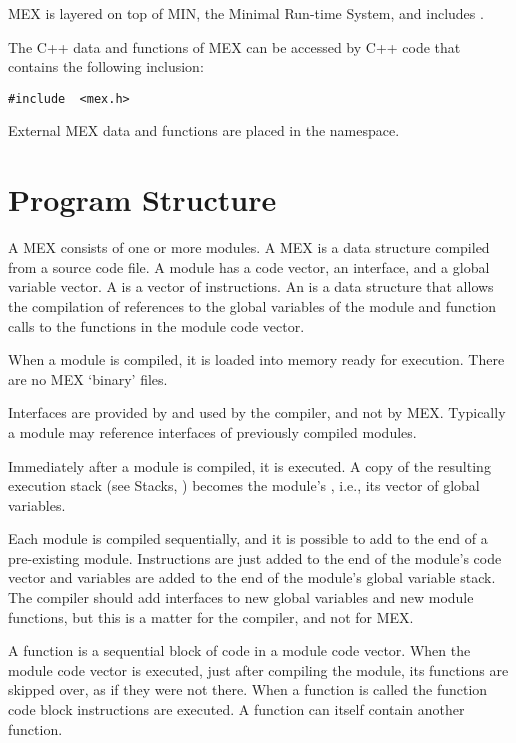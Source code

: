 \documentclass[12pt]{article}
\begin{document}
MEX is layered on top of MIN, the Minimal Run-time System, and
includes .

The C++ data and functions of MEX can be
accessed by C++ code that contains the following inclusion:

\begin{center}
\verb|#include  <mex.h>|
\end{center}

External MEX data and functions are placed in the
 namespace.

\section{Program Structure}
\label{PROGRAM-STRUCTURE}

A MEX  consists of one or more modules.
A MEX  is a data structure compiled from
a source code file.  A module has a code vector,
an interface, and a global variable vector.  A  is a vector
of instructions.  An  is a data structure
that allows the compilation of references to the
global variables of the module and function calls to the
functions in the module code vector.

When a module is compiled, it is loaded into memory
ready for execution.  There are no MEX `binary' files.

Interfaces are provided by and used by the compiler, and
not by MEX.  Typically a module may reference interfaces
of previously compiled modules.

Immediately after a module is compiled, it is executed.  A copy of the
resulting execution stack (see Stacks, ) becomes the
module's , i.e., its vector of
global variables.

Each module is compiled sequentially, and it is possible to add
to the end of a pre-existing module.  Instructions are
just added to the end of the module's code vector
and variables are added to the end of
the module's global variable stack.  The compiler should add
interfaces to new global variables and new module functions, but
this is a matter for the compiler, and not for MEX.

A function is a sequential block of code in a module code vector.
When the module code vector is executed, just after compiling
the module, its functions are skipped over, as if they were not
there.  When a function is called
the function code block instructions are executed.  A function
can itself contain another function.
\end{document}

